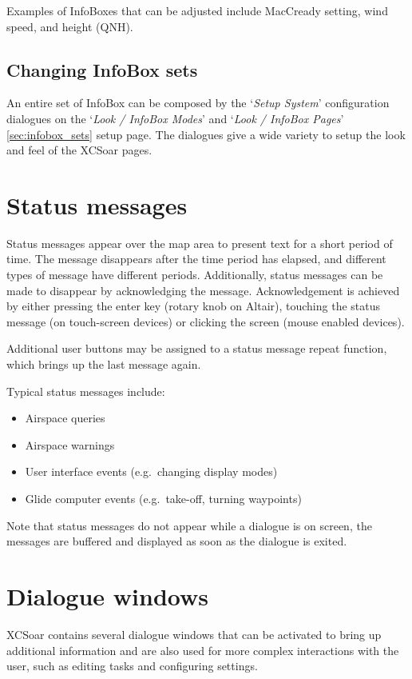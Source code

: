 Examples of InfoBoxes that can
be adjusted include MacCready setting, wind speed, and height (QNH).


\subsection*{Changing InfoBox sets}

An entire set of InfoBox can be composed by the `{\it Setup System}' configuration
dialogues on the `{\it Look / InfoBox Modes}' and `{\it Look / InfoBox Pages}'
\ref{sec:infobox_sets} setup page.
The dialogues give a wide variety to setup the look and feel of the XCSoar pages.


\section{Status messages}

Status messages appear over the map area to present text for a short period of
time.  The message disappears after the time period has elapsed, and different
types of message have different periods. Additionally, status messages can be
made to disappear by acknowledging the message.  Acknowledgement is achieved by
either pressing the enter key (rotary knob on Altair), touching the status
message (on touch-screen devices) or clicking the screen (mouse enabled devices).

Additional user buttons may be assigned to a status message repeat function,
which brings up the last message again.

Typical status messages include:
\begin{itemize}
\item Airspace queries
\item Airspace warnings
\item User interface events (e.g.\ changing display modes)
\item Glide computer events (e.g.\ take-off, turning waypoints)
\end{itemize}

Note that status messages do not appear while a dialogue is on screen, the
messages are buffered and displayed as soon as the dialogue is exited.


\section{Dialogue windows}\label{sec:dialog-windows}

XCSoar contains several dialogue windows that can be activated to bring up
additional information and are also used for more complex interactions with the
user, such as editing tasks and configuring settings.

